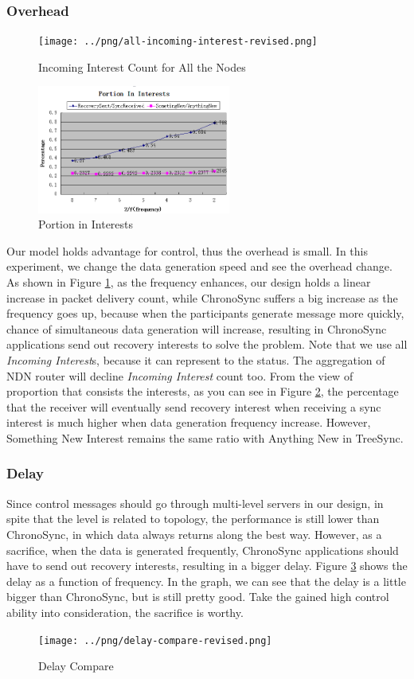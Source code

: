 \documentclass[conference]{IEEEtran}
\begin{document}
\subsubsection{Overhead}
\begin{figure}[!t]
\centering
\texttt{[image: ../png/all-incoming-interest-revised.png]}
\caption{Incoming Interest Count for All the Nodes}
\label{overhead}
\end{figure}
\begin{figure}[!t]
\centering
\includegraphics[width=2.5in]{../png/portion-in-interests.png}
\caption{Portion in Interests}
\label{recovery_percentage}
\end{figure}
Our model holds advantage for control,
thus the overhead is small. In this experiment,
we change the data generation speed and see the overhead change.
As shown in Figure \ref{overhead},
as the frequency enhances, our design holds a linear increase in packet delivery count,
while ChronoSync suffers a big increase as the frequency goes up,
because when the participants generate message more quickly,
chance of simultaneous data generation will increase,
resulting in ChronoSync applications send out recovery interests to solve the problem.
Note that we use all \emph{Incoming Interest}s,
because it can represent to the status.
The aggregation of NDN router will decline \emph{Incoming Interest} count too.
From the view of proportion that consists the interests,
as you can see in Figure \ref{recovery_percentage},
the percentage that the receiver will eventually send recovery interest
when receiving a sync interest is much higher when data generation frequency increase.
However, Something New Interest remains the same ratio with Anything New in TreeSync.

\subsubsection{Delay}
Since control messages should go through multi-level servers in our design,
in spite that the level is related to topology,
the performance is still lower than ChronoSync,
in which data always returns along the best way.
However, as a sacrifice, when the data is generated frequently,
ChronoSync applications should have to send out recovery interests,
resulting in a bigger delay. Figure \ref{delay_compare}
shows the delay as a function of frequency.
In the graph, we can see that the delay is a little bigger than ChronoSync,
but is still pretty good. Take the gained high control ability into consideration,
the sacrifice is worthy.
\begin{figure}[!t]
\centering
\texttt{[image: ../png/delay-compare-revised.png]}
\caption{Delay Compare}
\label{delay_compare}
\end{figure}
\end{document}
